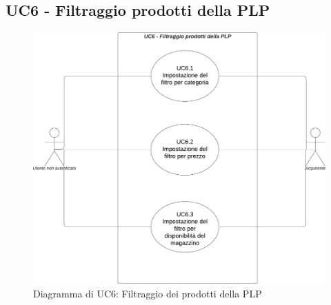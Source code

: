\subsection{UC6 - Filtraggio prodotti della PLP} \label{UC6}

\begin{figure}[H]
    \centering
    \includegraphics[scale=0.5]{Immagini/DiagrammiUC/UC6FiltraggioProdottiDellaPLP.png}
    \caption{Diagramma di UC6: Filtraggio dei prodotti della PLP} 
\end{figure}


